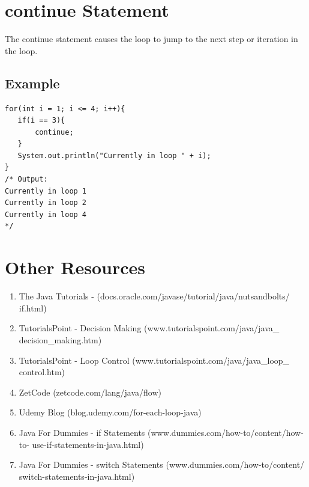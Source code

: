 \documentclass[a4paper]{article}
\begin{document}
\section*{continue Statement}

The continue statement causes the loop to jump to the next step or iteration in
the loop.

\subsection*{Example}
\begin{lstlisting}
for(int i = 1; i <= 4; i++){
   if(i == 3){
       continue;
   }
   System.out.println("Currently in loop " + i);
}
/* Output:
Currently in loop 1
Currently in loop 2
Currently in loop 4
*/
\end{lstlisting}

\newpage

\section*{Other Resources}
\begin{enumerate}

\item The Java Tutorials - (docs.oracle.com/javase/tutorial/java/nutsandbolts/
if.html)

\item TutorialsPoint - Decision Making (www.tutorialspoint.com/java/java\_
decision\_making.htm)

\item TutorialsPoint - Loop Control (www.tutorialspoint.com/java/java\_loop\_
control.htm)

\item ZetCode (zetcode.com/lang/java/flow)

\item Udemy Blog (blog.udemy.com/for-each-loop-java)

\item Java For Dummies - if Statements (www.dummies.com/how-to/content/how-to-
use-if-statements-in-java.html)

\item Java For Dummies - switch Statements (www.dummies.com/how-to/content/
switch-statements-in-java.html)

\end{enumerate}
\end{document}

